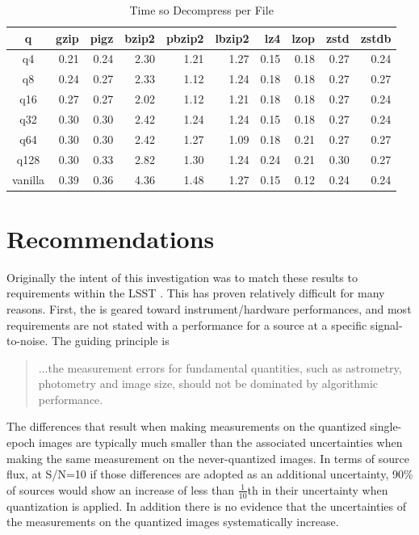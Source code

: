 \begin{table}
\caption{Time so Decompress per File}
\centering
\begin{tabular}[]{crrrrrrrrr}
\hline
 q        &  gzip & pigz & bzip2 & pbzip2 & lbzip2 & lz4 & lzop & zstd & zstdb  \\
\hline
 q4       &    0.21 &   0.24 &   2.30 &   1.21 &   1.27 &   0.15 &   0.18 &   0.27 &   0.24  \\
 q8       &    0.24 &   0.27 &   2.33 &   1.12 &   1.24 &   0.18 &   0.18 &   0.27 &   0.27  \\
 q16      &    0.27 &   0.27 &   2.02 &   1.12 &   1.21 &   0.18 &   0.18 &   0.27 &   0.24  \\
 q32      &    0.30 &   0.30 &   2.42 &   1.24 &   1.24 &   0.15 &   0.18 &   0.27 &   0.24  \\
 q64      &    0.30 &   0.30 &   2.42 &   1.27 &   1.09 &   0.18 &   0.21 &   0.27 &   0.27  \\
 q128     &    0.30 &   0.33 &   2.82 &   1.30 &   1.24 &   0.24 &   0.21 &   0.30 &   0.27  \\
 vanilla  &    0.39 &   0.36 &   4.36 &   1.48 &   1.27 &   0.15 &   0.12 &   0.24 &   0.24  \\
\hline
\end{tabular}
\label{timing_decompress}
\end{table}


\clearpage

\section{Recommendations}

Originally the intent of this investigation was to match these results to requirements within the 
LSST \SRD {}.  This has proven relatively difficult for many reasons.
First, the \SRD is geared toward instrument/hardware performances, and most requirements are not 
stated with a performance for a source at a specific signal-to-noise.  The guiding principle is
\begin{quote} ...the measurement errors for fundamental quantities, 
such as astrometry, photometry and image size, should not be dominated by algorithmic performance.
\end{quote}
The differences that result when making measurements on the quantized single-epoch images are typically 
much smaller than the associated uncertainties when making the same measurement on the never-quantized
images.  In terms of source flux, at S/N=10 if those differences are adopted as an additional uncertainty, 
90\% of sources would show an increase of less than $\frac{1}{10}$th in their uncertainty when quantization 
is applied.  In addition there is no evidence that the uncertainties of the measurements on the quantized 
images systematically increase.

